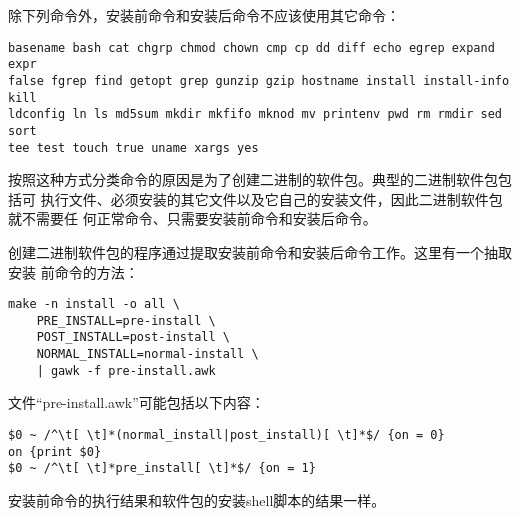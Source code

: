 除下列命令外，安装前命令和安装后命令不应该使用其它命令：
\begin{Verbatim}[]
basename bash cat chgrp chmod chown cmp cp dd diff echo egrep expand expr
false fgrep find getopt grep gunzip gzip hostname install install-info kill
ldconfig ln ls md5sum mkdir mkfifo mknod mv printenv pwd rm rmdir sed sort
tee test touch true uname xargs yes
\end{Verbatim}

按照这种方式分类命令的原因是为了创建二进制的软件包。典型的二进制软件包包括可
执行文件、必须安装的其它文件以及它自己的安装文件，因此二进制软件包就不需要任
何正常命令、只需要安装前命令和安装后命令。

创建二进制软件包的程序通过提取安装前命令和安装后命令工作。这里有一个抽取安装
前命令的方法：

\begin{Verbatim}[]
make -n install -o all \
    PRE_INSTALL=pre-install \
    POST_INSTALL=post-install \
    NORMAL_INSTALL=normal-install \
    | gawk -f pre-install.awk
\end{Verbatim}

文件“pre-install.awk”可能包括以下内容：
\begin{Verbatim}[]
$0 ~ /^\t[ \t]*(normal_install|post_install)[ \t]*$/ {on = 0}
on {print $0}
$0 ~ /^\t[ \t]*pre_install[ \t]*$/ {on = 1}
\end{Verbatim}

安装前命令的执行结果和软件包的安装shell脚本的结果一样。
